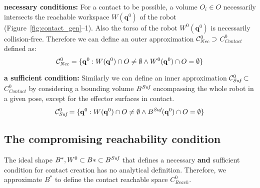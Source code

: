 \textbf{necessary conditions:}
For a contact to be possible, a volume $O_i \in O$ necessarily intersects the reachable workspace $W(\mathbf{q}^{0})$ of the robot (Figure~\ref{fig:contact_gen}--1). Also the torso of the robot $W^0(\mathbf{q}^{0})$ is necessarily collision-free.
Therefore we can define an outer approximation  $ \mathcal{C}^0_{\textrm{\it Nec}} \supset$ $C_{Contact}^0$ defined as: 
\begin{equation}
\mathcal{C}^0_{\textrm{\it Nec}} = \{ \mathbf{q}^0 : W(\mathbf{q}^{0}) \cap O \neq \emptyset \wedge W^0(\mathbf{q}^{0}) \cap O = \emptyset \} %
\end{equation}
 

\textbf{a sufficient condition:}
Similarly we can define an inner approximation \mbox{$\mathcal{C}^0_{\textrm{\it Suf}} \subset $ $C_{Contact}^0$} by considering a bounding volume $B^{\textrm{\it Suf}}$ encompassing the whole robot in a given pose, except for the effector surfaces in contact. 
\begin{equation}
\mathcal{C}^0_{\textrm{\it Suf}} = \{ \mathbf{q}^0 : W(\mathbf{q}^{0}) \cap O \neq \emptyset \wedge B^{\textrm{\it Suf}}(\mathbf{q}^{0}) \cap O = \emptyset \} %
\end{equation}


\subsection{The compromising reachability condition}
The ideal shape $B^*, W^0 \subset B* \subset B^{\textrm{\it Suf}}$ that defines a necessary \textbf{and} sufficient condition for contact creation has no analytical definition.
Therefore, we approximate $B^*$ to define the contact reachable space $C_{Reach}^0$.

